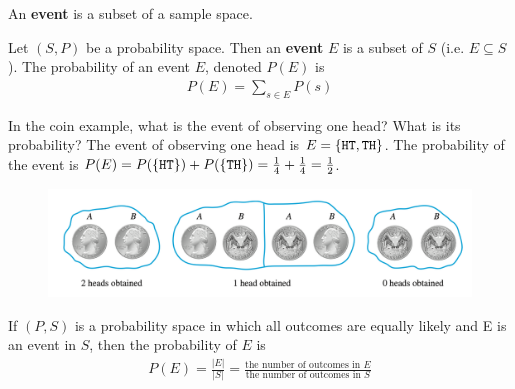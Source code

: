 \documentclass[10pt]{beamer}
\begin{document}
\begin{frame}
\small 
\begin{myredbox}[title=Overview]
An \textbf{event} is a subset of a sample space.  
\end{myredbox}
\vfill \pause
\begin{mygreenbox}[title=Definition]
Let $(S,P)$ be a probability space.  Then an \textbf{event} $E$ is a subset of $S$ (i.e. $E \subseteq S$).  The probability of an event $E$, denoted $P(E)$ is
%
\begin{align}
P(E) = \sum_{s \in E} P(s) 
\label{eqn:probability_of_event}
\end{align}


\end{mygreenbox}
\vfill \pause

\begin{myyellowbox}[title=Poll]
In the coin example, what is the event of observing one head?  What is its probability? \pause  The event of observing one head is $E = \{ {\texttt{HT}, \texttt{TH}} \}$.  \pause The probability of the event is $P(E) = P(\{ {\texttt{HT}} \}) + P(\{ {\texttt{TH}} \}) = \frac{1}{4} + \frac{1}{4} = \frac{1}{2}$. \pause 
	
\begin{figure}
\includegraphics[width=.8\textwidth]{images/coins_2.png}	
\end{figure}

\end{myyellowbox}


\end{frame}



\begin{frame}
\begin{mygreenbox}[title=\text{Proposition: Equally Likely Probability Formula}]
If $(P,S)$ is a probability space in which all outcomes are equally likely and E is an event in $S$, then the probability of $E$ is
%
\begin{align*}
P(E) = \frac{|E|}{|S|} = \frac{\text{the number of outcomes in } E }{\text{the number of outcomes in } S}	
\end{align*}
\end{mygreenbox}
%

\end{frame}
\end{document}
